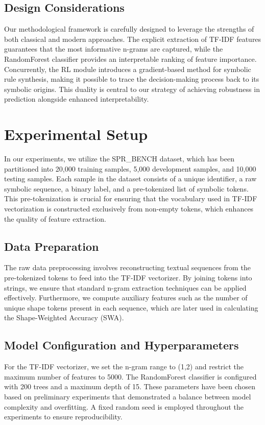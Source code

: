\documentclass{article}
\begin{document}
\subsection{Design Considerations}
Our methodological framework is carefully designed to leverage the strengths of both classical and modern approaches. The explicit extraction of TF-IDF features guarantees that the most informative n-grams are captured, while the RandomForest classifier provides an interpretable ranking of feature importance. Concurrently, the RL module introduces a gradient-based method for symbolic rule synthesis, making it possible to trace the decision-making process back to its symbolic origins. This duality is central to our strategy of achieving robustness in prediction alongside enhanced interpretability.

\section{Experimental Setup}
In our experiments, we utilize the SPR\_BENCH dataset, which has been partitioned into 20,000 training samples, 5,000 development samples, and 10,000 testing samples. Each sample in the dataset consists of a unique identifier, a raw symbolic sequence, a binary label, and a pre-tokenized list of symbolic tokens. This pre-tokenization is crucial for ensuring that the vocabulary used in TF-IDF vectorization is constructed exclusively from non-empty tokens, which enhances the quality of feature extraction.

\subsection{Data Preparation}
The raw data preprocessing involves reconstructing textual sequences from the pre-tokenized tokens to feed into the TF-IDF vectorizer. By joining tokens into strings, we ensure that standard n-gram extraction techniques can be applied effectively. Furthermore, we compute auxiliary features such as the number of unique shape tokens present in each sequence, which are later used in calculating the Shape-Weighted Accuracy (SWA).

\subsection{Model Configuration and Hyperparameters}
For the TF-IDF vectorizer, we set the n-gram range to (1,2) and restrict the maximum number of features to 5000. The RandomForest classifier is configured with 200 trees and a maximum depth of 15. These parameters have been chosen based on preliminary experiments that demonstrated a balance between model complexity and overfitting. A fixed random seed is employed throughout the experiments to ensure reproducibility.
\end{document}
